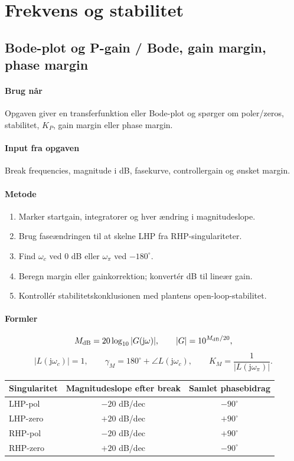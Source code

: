 \section{Frekvens og stabilitet}

\subsection{Bode-plot og P-gain / Bode, gain margin, phase margin}
\label{sec:bode}

\paragraph{Brug når}
Opgaven giver en transferfunktion eller Bode-plot og spørger om poler/zeros,
stabilitet, \(K_P\), gain margin eller phase margin.

\paragraph{Input fra opgaven}
Break frequencies, magnitude i dB, fasekurve, controllergain og ønsket margin.

\paragraph{Metode}
\begin{enumerate}
\item Marker startgain, integratorer og hver ændring i magnitudeslope.
\item Brug faseændringen til at skelne LHP fra RHP-singulariteter.
\item Find \(\omega_c\) ved 0 dB eller \(\omega_\pi\) ved \(-180^\circ\).
\item Beregn margin eller gainkorrektion; konvertér dB til lineær gain.
\item Kontrollér stabilitetskonklusionen med plantens open-loop-stabilitet.
\end{enumerate}

\paragraph{Formler}
\[
M_{\mathrm{dB}}=20\log_{10}|G(\mathrm{j}\omega)|,\qquad
|G|=10^{M_{\mathrm{dB}}/20},
\]
\[
|L(\mathrm{j}\omega_c)|=1,\qquad
\gamma_M=180^\circ+\angle L(\mathrm{j}\omega_c),\qquad
K_M=\frac1{|L(\mathrm{j}\omega_\pi)|}.
\]
\begin{center}
\begin{tabular}{@{}lcc@{}}
\toprule
Singularitet & Magnitudeslope efter break & Samlet phasebidrag\\
\midrule
LHP-pol & \(-20\) dB/dec & \(-90^\circ\)\\
LHP-zero & \(+20\) dB/dec & \(+90^\circ\)\\
RHP-pol & \(-20\) dB/dec & \(+90^\circ\)\\
RHP-zero & \(+20\) dB/dec & \(-90^\circ\)\\
\bottomrule
\end{tabular}
\end{center}

